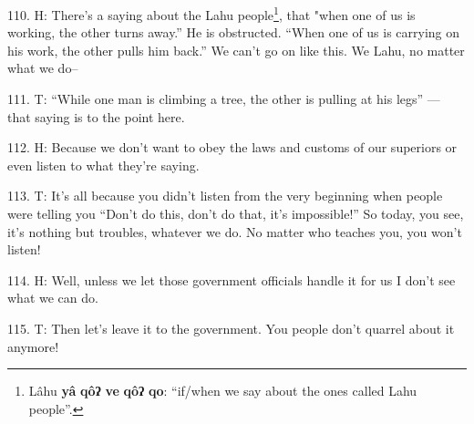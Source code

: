 110. H: There's a saying about the Lahu people\footnote{Lâhu \textbf{yâ} \textbf{qôʔ} \textbf{ve} \textbf{qôʔ} \textbf{qo}: ``if/when we say about the ones called Lahu people''.}, that "when one of us
is working, the other turns away.'' He is obstructed. ``When one of us is carrying
on his work, the other pulls him back.'' We can't go on like this. We Lahu, no
matter what we do--

111. T: ``While one man is climbing a tree, the other is pulling at his legs''
--- that saying is to the point here.

112. H: Because we don't want to obey the laws and customs of our superiors or even
listen to what they're saying.

113. T: It's all because you didn't listen from the very beginning when people
were telling you ``Don't do this, don't do that, it's impossible!''
So today, you see, it's nothing but troubles, whatever we do. No matter who teaches
you, you won't listen!

114. H: Well, unless we let those government officials handle it for us I don't
see what we can do.

115. T: Then let's leave it to the government. You people don't quarrel about
it anymore!

